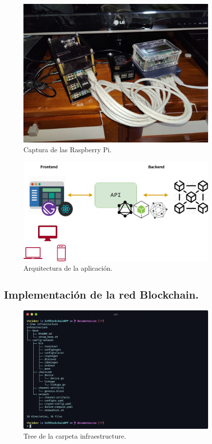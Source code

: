 \begin{figure}[ht!]
  \centering
  \includegraphics[width=10cm]{imagenes/desarrollo/foto_raspberry}
  \caption{Captura de las Raspberry Pi.}
  \label{fig:captura-raspberry}
\end{figure}

\begin{figure}[ht!]
  \centering
  \includegraphics[width=10cm]{imagenes/desarrollo/arquitectura_aplicacion}
  \caption{Arquitectura de la aplicación.}
  \label{fig:arquitectura-aplicacion}
\end{figure}

\subsection{Implementación de la red Blockchain.}

\begin{figure}[ht!]
  \centering
  \includegraphics[width=10cm]{imagenes/desarrollo/tree_infraestructure}
  \caption{Tree de la carpeta infraestructure.}
  \label{fig:tree-infraestructure}
\end{figure}

